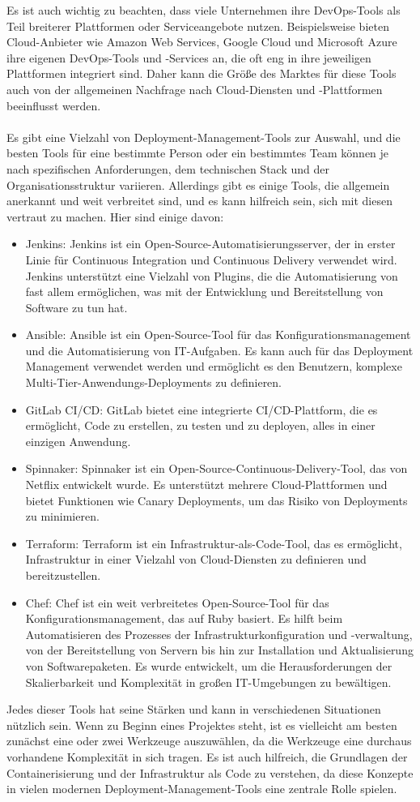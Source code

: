 Es ist auch wichtig zu beachten, dass viele Unternehmen ihre DevOps-Tools als Teil breiterer Plattformen oder Serviceangebote nutzen. Beispielsweise bieten Cloud-Anbieter wie Amazon Web Services, Google Cloud und Microsoft Azure ihre eigenen DevOps-Tools und -Services an, die oft eng in ihre jeweiligen Plattformen integriert sind. Daher kann die Größe des Marktes für diese Tools auch von der allgemeinen Nachfrage nach Cloud-Diensten und -Plattformen beeinflusst werden.
\\\\
Es gibt eine Vielzahl von Deployment-Management-Tools zur Auswahl, und die besten Tools für eine bestimmte Person oder ein bestimmtes Team können je nach spezifischen Anforderungen, dem technischen Stack und der Organisationsstruktur variieren. Allerdings gibt es einige Tools, die allgemein anerkannt und weit verbreitet sind, und es kann hilfreich sein, sich mit diesen vertraut zu machen. Hier sind einige davon:
\begin{itemize} 
\item Jenkins: Jenkins ist ein Open-Source-Automatisierungsserver, der in erster Linie für Continuous Integration und Continuous Delivery verwendet wird. Jenkins unterstützt eine Vielzahl von Plugins, die die Automatisierung von fast allem ermöglichen, was mit der Entwicklung und Bereitstellung von Software zu tun hat.
\item Ansible: Ansible ist ein Open-Source-Tool für das Konfigurationsmanagement und die Automatisierung von IT-Aufgaben. Es kann auch für das Deployment Management verwendet werden und ermöglicht es den Benutzern, komplexe Multi-Tier-Anwendungs-Deployments zu definieren.
\item GitLab CI/CD: GitLab bietet eine integrierte CI/CD-Plattform, die es ermöglicht, Code zu erstellen, zu testen und zu deployen, alles in einer einzigen Anwendung.
\item Spinnaker: Spinnaker ist ein Open-Source-Continuous-Delivery-Tool, das von Netflix entwickelt wurde. Es unterstützt mehrere Cloud-Plattformen und bietet Funktionen wie Canary Deployments, um das Risiko von Deployments zu minimieren.
\item Terraform: Terraform ist ein Infrastruktur-als-Code-Tool, das es ermöglicht, Infrastruktur in einer Vielzahl von Cloud-Diensten zu definieren und bereitzustellen.
\item Chef: Chef ist ein weit verbreitetes Open-Source-Tool für das Konfigurationsmanagement, das auf Ruby basiert. Es hilft beim Automatisieren des Prozesses der Infrastrukturkonfiguration und -verwaltung, von der Bereitstellung von Servern bis hin zur Installation und Aktualisierung von Softwarepaketen. Es wurde entwickelt, um die Herausforderungen der Skalierbarkeit und Komplexität in großen IT-Umgebungen zu bewältigen.
\end{itemize} 
Jedes dieser Tools hat seine Stärken und kann in verschiedenen Situationen nützlich sein. Wenn zu Beginn eines Projektes steht, ist es vielleicht am besten zunächst eine oder zwei Werkzeuge auszuwählen, da die Werkzeuge eine durchaus vorhandene Komplexität in sich tragen. Es ist auch hilfreich, die Grundlagen der Containerisierung und der Infrastruktur als Code zu verstehen, da diese Konzepte in vielen modernen Deployment-Management-Tools eine zentrale Rolle spielen.
